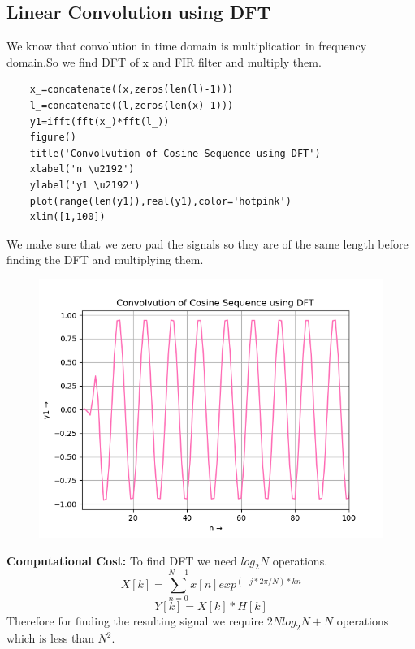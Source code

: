\documentclass[11pt, a4paper]{article}
\begin{document}
\subsection{Linear Convolution using DFT}
We know that convolution in time domain is multiplication in frequency domain.So we find DFT of x and FIR filter and multiply them.
\begin{verbatim}
    x_=concatenate((x,zeros(len(l)-1)))
    l_=concatenate((l,zeros(len(x)-1)))
    y1=ifft(fft(x_)*fft(l_))
    figure()
    title('Convolvution of Cosine Sequence using DFT')
    xlabel('n \u2192')
    ylabel('y1 \u2192')
    plot(range(len(y1)),real(y1),color='hotpink')
    xlim([1,100])
\end{verbatim}
We make sure that we zero pad the signals so they are of the same length before finding the DFT and multiplying them.
\begin{figure}[H]
   	\centering
   	\includegraphics[scale=0.5]{Figure_4.png}
\end{figure}
\textbf{Computational Cost:}
To find DFT we need $log_{2}N$ operations.
\begin{equation}
    X[k] = \sum_{n=0}^{N-1}x[n]exp^{(-j*2\pi/N)*kn}
\end{equation}
\begin{equation}
    Y[k] = X[k]*H[k]
\end{equation}
Therefore for finding the resulting signal we require $2Nlog_{2}N+N$ operations which is less than $N^2$.
\end{document}
